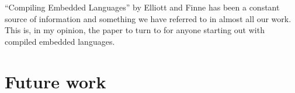 \documentclass[a4paper]{book}
\begin{document}
``Compiling Embedded Languages'' by Elliott and Finne has been a constant source of information 
and something we have referred to in almost all our work. This is, in my opinion, the paper to turn 
to for anyone starting out with compiled embedded languages. 






\FloatBarrier
%
%
\section{Future work} 
\end{document}
